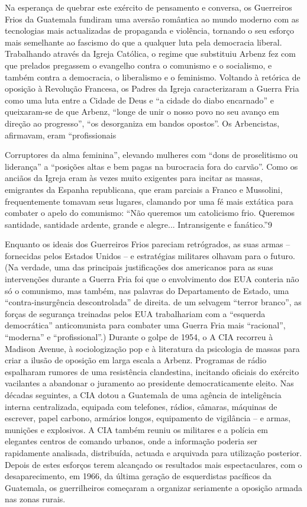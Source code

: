  \par 
Na esperança de quebrar este exército de pensamento e conversa, os Guerreiros Frios da Guatemala fundiram uma aversão romântica ao mundo moderno com as tecnologias mais actualizadas de propaganda e violência, tornando o seu esforço mais semelhante ao fascismo do que a qualquer luta pela democracia liberal. Trabalhando através da Igreja Católica, o regime que substituiu Arbenz fez com que prelados pregassem o evangelho contra o comunismo e o socialismo, e também contra a democracia, o liberalismo e o feminismo. Voltando à retórica de oposição à Revolução Francesa, os Padres da Igreja caracterizaram a Guerra Fria como uma luta entre a Cidade de Deus e “a cidade do diabo encarnado” e queixaram-se de que Arbenz, “longe de unir o nosso povo no seu avanço em direção ao progresso”, “os desorganiza em bandos opostos”. Os Arbencistas, afirmavam, eram “profissionais
 \par 
Corruptores da alma feminina”, elevando mulheres com “dons de proselitismo ou liderança” a “posições altas e bem pagas na burocracia fora do carvão”. Como os anciãos da Igreja eram às vezes muito exigentes para incitar as massas, emigrantes da Espanha republicana, que eram parciais a Franco e Mussolini, frequentemente tomavam seus lugares, clamando por uma fé mais extática para combater o apelo do comunismo: “Não queremos um catolicismo frio. Queremos santidade, santidade ardente, grande e alegre... Intransigente e fanático.”{\color{blue}9}
 \par 
Enquanto os ideais dos Guerreiros Frios pareciam retrógrados, as suas armas – fornecidas pelos Estados Unidos – e estratégias militares olhavam para o futuro. (Na verdade, uma das principais justificações dos americanos para as suas intervenções durante a Guerra Fria foi que o envolvimento dos EUA conteria não só o comunismo, mas também, nas palavras do Departamento de Estado, uma “contra-insurgência descontrolada” de direita. de um selvagem “terror branco”, as forças de segurança treinadas pelos EUA trabalhariam com a “esquerda democrática” anticomunista para combater uma Guerra Fria mais “racional”, “moderna” e “profissional”.) Durante o golpe de 1954, o A CIA recorreu à Madison Avenue, à sociologização pop e à literatura da psicologia de massas para criar a ilusão de oposição em larga escala a Arbenz. Programas de rádio espalharam rumores de uma resistência clandestina, incitando oficiais do exército vacilantes a abandonar o juramento ao presidente democraticamente eleito. Nas décadas seguintes, a CIA dotou a Guatemala de uma agência de inteligência interna centralizada, equipada com telefones, rádios, câmaras, máquinas de escrever, papel carbono, armários longos, equipamento de vigilância – e armas, munições e explosivos. A CIA também reuniu os militares e a polícia em elegantes centros de comando urbanos, onde a informação poderia ser rapidamente analisada, distribuída, actuada e arquivada para utilização posterior. Depois de estes esforços terem alcançado os resultados mais espectaculares, com o desaparecimento, em 1966, da última geração de esquerdistas pacíficos da Guatemala, os guerrilheiros começaram a organizar seriamente a oposição armada nas zonas rurais.

